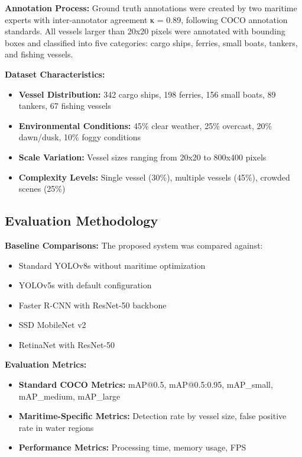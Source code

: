 \documentclass[12pt,a4paper]{report}
\begin{document}
\textbf{Annotation Process:} Ground truth annotations were created by two maritime experts with inter-annotator agreement κ = 0.89, following COCO annotation standards. All vessels larger than 20x20 pixels were annotated with bounding boxes and classified into five categories: cargo ships, ferries, small boats, tankers, and fishing vessels.

\textbf{Dataset Characteristics:}
\begin{itemize}
    \item \textbf{Vessel Distribution:} 342 cargo ships, 198 ferries, 156 small boats, 89 tankers, 67 fishing vessels
    \item \textbf{Environmental Conditions:} 45\% clear weather, 25\% overcast, 20\% dawn/dusk, 10\% foggy conditions
    \item \textbf{Scale Variation:} Vessel sizes ranging from 20x20 to 800x400 pixels
    \item \textbf{Complexity Levels:} Single vessel (30\%), multiple vessels (45\%), crowded scenes (25\%)
\end{itemize}

\subsection{Evaluation Methodology}

\textbf{Baseline Comparisons:} The proposed system was compared against:
\begin{itemize}
    \item Standard YOLOv8s without maritime optimization
    \item YOLOv5s with default configuration
    \item Faster R-CNN with ResNet-50 backbone
    \item SSD MobileNet v2
    \item RetinaNet with ResNet-50
\end{itemize}

\textbf{Evaluation Metrics:} 
\begin{itemize}
    \item \textbf{Standard COCO Metrics:} mAP@0.5, mAP@0.5:0.95, mAP\_small, mAP\_medium, mAP\_large
    \item \textbf{Maritime-Specific Metrics:} Detection rate by vessel size, false positive rate in water regions
    \item \textbf{Performance Metrics:} Processing time, memory usage, FPS
\end{itemize}
\end{document}
